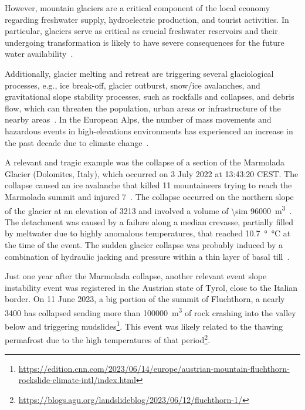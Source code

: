 However, mountain glaciers are a critical component of the local economy regarding freshwater supply, hydroelectric production, and tourist activities.
In particular, glaciers serve as critical as crucial freshwater reservoirs and their undergoing transformation is likely to have severe consequences for the future water availability~\citep{Barnett2005, hock2005}. 

Additionally, glacier melting and retreat are triggering several glaciological processes, e.g., ice break-off, glacier outburst, snow/ice avalanches, and gravitational slope stability processes, such as rockfalls and collapses, and debris flow, which can threaten the population, urban areas or infrastructure of the nearby areas~\citep{Kaab2004, Deline2015, Giordan2020}.
In the European Alps, the number of mass movements and hazardous events in high-elevations environments has experienced an increase in the past decade due to climate change~\citep{chiarle2023, Nigrelli2024}.

A relevant and tragic example was the collapse of a section of the Marmolada Glacier (Dolomites, Italy), which occurred on 3 July 2022 at 13:43:20 CEST. 
The collapse caused an ice avalanche that killed 11 mountaineers trying to reach the Marmolada summit and injured 7~\citep{Olivieri2023, Bondesan2023}.
The collapse occurred on the northern slope of the glacier at an elevation of \SI{3213}{\masl} and involved a volume of \SI{\sim 96000}{\cubic\meter}~\citep{Olivieri2023}.
The detachment was caused by a failure along a median crevasse, partially filled by meltwater due to highly anomalous temperatures, that reached \SI{10.7}{\degree\celsius} at the time of the event.
The sudden glacier collapse was probably induced by a combination of hydraulic jacking and pressure within a thin layer of basal till~\citep{Bondesan2023}.

Just one year after the Marmolada collapse, another relevant event slope instability event was registered in the Austrian state of Tyrol, close to the Italian border. 
On 11 June 2023, a big portion of the summit of Fluchthorn, a nearly \SI{3400}{\masl} has collapsed sending more than \SI{100000}{\cubic\meter} of rock crashing into the valley below and triggering mudslides\footnote{\mbox{\url{https://edition.cnn.com/2023/06/14/europe/austrian-mountain-fluchthorn-rockslide-climate-intl/index.html}}}.
This event was likely related to the thawing permafrost due to the high temperatures of that period\footnote{\url{https://blogs.agu.org/landslideblog/2023/06/12/fluchthorn-1/}}.

